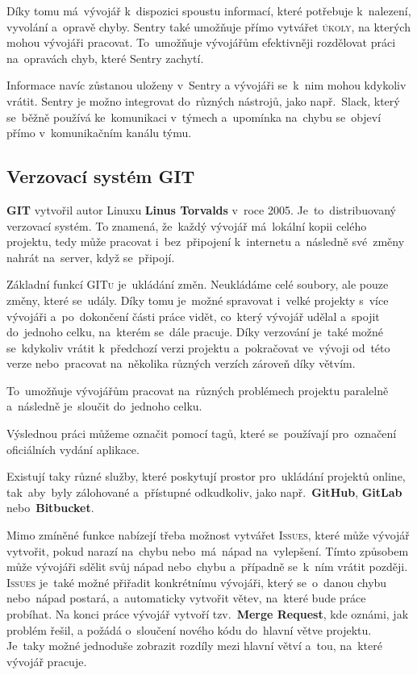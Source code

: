 \documentclass[14pt,a4paper]{article}
\begin{document}
            Díky tomu má~vývojář k~dispozici spoustu informací, které potřebuje k~nalezení, vyvolání a~opravě chyby.
            Sentry také umožňuje přímo vytvářet \textsc{úkoly}, na kterých mohou vývojáři pracovat.
            To~umožňuje vývojářům efektivněji rozdělovat práci na~opravách chyb, které Sentry zachytí.

            Informace navíc zůstanou uloženy v~Sentry a vývojáři se~k~nim mohou kdykoliv vrátit.
            Sentry je možno integrovat do~různých nástrojů, jako např.~Slack, který se~běžně používá ke~komunikaci v~týmech
            a~upomínka na~chybu se~objeví přímo v~komunikačním kanálu týmu.
	
        \subsection{Verzovací systém GIT}
        \textbf{GIT} vytvořil autor Linuxu \textbf{Linus Torvalds} v~roce 2005. Je~to~distribuovaný verzovací systém. To znamená, že~každý vývojář má~lokální kopii celého projektu, tedy může pracovat i~bez~připojení k~internetu a~následně své~změny nahrát na~server, když se~připojí.
        
        Základní funkcí \textsc{GITu} je~ukládání změn. Neukládáme celé soubory, ale pouze změny, které se~udály. Díky tomu je~možné spravovat i~velké projekty s~více vývojáři a~po~dokončení části práce vidět, co~který vývojář udělal a~spojit do~jednoho celku, na~kterém se~dále pracuje. Díky verzování je~také možné se~kdykoliv vrátit k~předchozí verzi projektu a~pokračovat ve~vývoji od~této verze nebo~pracovat na~několika různých verzích zároveň díky větvím.
        
        To~umožňuje vývojářům pracovat na~různých problémech projektu paralelně a~následně je~sloučit do~jednoho celku.

        Výslednou práci můžeme označit pomocí tagů, které se~používají pro~označení oficiálních vydání aplikace.

        Existují taky různé služby, které poskytují prostor pro~ukládání projektů online, tak~aby~byly zálohované a~přístupné odkudkoliv, jako např.~\textbf{GitHub}, \textbf{GitLab} nebo~\textbf{Bitbucket}.

        Mimo zmíněné funkce nabízejí třeba možnost vytvářet \textsc{Issues}, které může vývojář vytvořit, pokud narazí na~chybu nebo~má~nápad na~vylepšení. Tímto způsobem může vývojáři sdělit svůj nápad nebo~chybu a~případně se~k~ním vrátit později. \textsc{Issues} je~také možné přiřadit konkrétnímu vývojáři, který se~o~danou chybu nebo~nápad postará, a~automaticky vytvořit větev, na~které bude práce probíhat. Na konci práce vývojář vytvoří tzv.~\textbf{Merge Request}, kde oznámi, jak problém řešil, a požádá o~sloučení nového kódu do~hlavní větve projektu. Je~taky možné jednoduše zobrazit rozdíly mezi hlavní větví a~tou, na~které vývojář pracuje.
        
\end{document}
